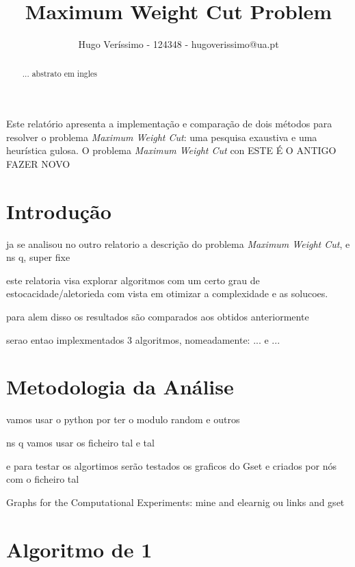 \documentclass[mirror, portugues]{revdetua}
\begin{document}

\title{Maximum Weight Cut Problem}
\author{Hugo Veríssimo - 124348 - hugoverissimo@ua.pt}
\maketitle

\begin{abstract}
... abstrato em ingles
\end{abstract}

\begin{resumo}
Este relatório apresenta a implementação e comparação de dois métodos para resolver o problema \textit{Maximum Weight Cut}: uma pesquisa exaustiva e uma heurística gulosa. O problema \textit{Maximum Weight Cut} con ESTE É O ANTIGO FAZER NOVO
\end{resumo}

\section{Introdução}

ja se analisou no outro relatorio a descrição do problema \textit{Maximum Weight Cut}, \cite{BS22} e ns q, super fixe

este relatoria visa explorar algoritmos com um certo grau de estocacidade/aletorieda com vista em otimizar a complexidade e as solucoes.

para alem disso os resultados são comparados aos obtidos anteriormente

serao entao implexmentados 3 algoritmos, nomeadamente: ... e ...

\section{Metodologia da Análise}

vamos usar o python por ter o modulo random e outros

ns q vamos usar os ficheiro tal e tal 

e para testar os algortimos serão testados os graficos do Gset e criados por nós com o ficheiro tal

Graphs for the Computational Experiments: mine and elearnig ou links and gset

\section{Algoritmo de 1}
\end{document}
